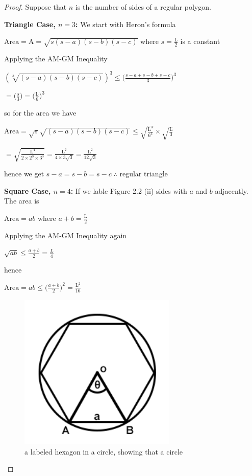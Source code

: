 \documentclass[a4paper]{book}
\numberwithin{theorem}{section}%
\begin{document}
\begin{proof} 
    Suppose that $n$ is the number of sides of a regular polygon.

    \textbf{Triangle Case, $n=3$:} We start with Heron's formula
    \begin{center}
        $\displaystyle \mathrm{Area}=\mathrm{A}=\sqrt{s(s-a)(s-b)(s-c)}$ where $\displaystyle s=\frac{\mathrm{L}}{2}$ is a constant
    \end{center}
    Applying the AM-GM Inequality
    \begin{center}
        $\displaystyle (\sqrt[3]{(s-a)(s-b)(s-c)})^{3}\leq\Big(\frac{s-a+s-b+s-c}{3}\Big)^{3}$

        $\displaystyle =\Big(\frac{s}{3}\Big)=\Big(\frac{\mathrm{L}}{6}\Big)^{3}$
    \end{center}
    so for the area we have
    \begin{center}
        $\displaystyle \mathrm{Area}=\sqrt{s}\sqrt{(s-a)(s-b)(s-c)}\leq\sqrt{\frac{\mathrm{L}^{3}}{6^3}}\times\sqrt{\frac{\mathrm{L}}{3}}$

        $\displaystyle =\sqrt{\frac{\mathrm{L}^{4}}{2\times2^{3}\times3^{3}}}=\frac{\mathrm{L}^{2}}{4\times3\sqrt{3}}=\frac{\mathrm{L}^{2}}{12\sqrt{3}}$
    \end{center}
    hence we get $\displaystyle s-a=s-b=s-c\;\therefore$ regular triangle

    \textbf{Square Case, $n=4$:} If we lable Figure 2.2 (ii) sides with $a$ and $b$ adjacently. The area is
    \begin{center}
        $\displaystyle \mathrm{Area}=ab$ where $\displaystyle a+b=\frac{\mathrm{L}}{2}$
    \end{center}
    Applying the AM-GM Inequality again
    \begin{center}
        $\displaystyle \sqrt{ab}\leq\frac{a+b}{2}=\frac{L}{4}$
    \end{center}
    hence
    \begin{center}
        $\displaystyle \mathrm{Area}=ab\leq\Big(\frac{a+b}{2}\Big)^{2}=\frac{\mathrm{L}^{2}}{16}$
    \end{center}

    \begin{figure}[hbt!]
        \begin{center}   
            \includegraphics[width=75mm]{isofig12}
            \caption{a labeled hexagon in a circle, showing that a circle }
        \end{center}
    \end{figure}\leavevmode
    

\end{proof}
\end{document}
